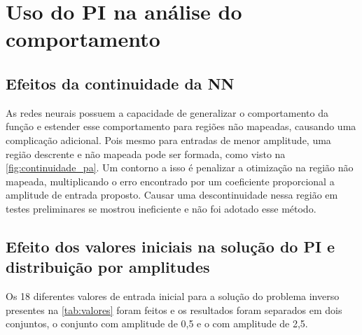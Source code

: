 \section{Uso do PI na análise do comportamento} \label{sec:estudoi-pi}

\subsection{Efeitos da continuidade da NN} \label{subsec:estudoi-pi-conti}
As redes neurais possuem a capacidade de generalizar o comportamento da função e estender esse comportamento para regiões não mapeadas, causando uma complicação adicional. Pois mesmo para entradas de menor amplitude, uma região descrente e não mapeada pode ser formada, como visto na \autoref{fig:continuidade_pa}. Um contorno a isso é penalizar a otimização na região não mapeada, multiplicando o erro encontrado por um coeficiente proporcional a amplitude de entrada proposto. Causar uma descontinuidade nessa região em testes preliminares se mostrou ineficiente e não foi adotado esse método.


\subsection{Efeito dos valores iniciais na solução do PI e distribuição por amplitudes} \label{subsec:estudoi-pi-efeito}
Os 18 diferentes valores de entrada inicial para a solução do problema inverso presentes na \autoref{tab:valores} foram feitos e os resultados foram separados em dois conjuntos, o conjunto com amplitude de 0,5 e o com amplitude de 2,5.

